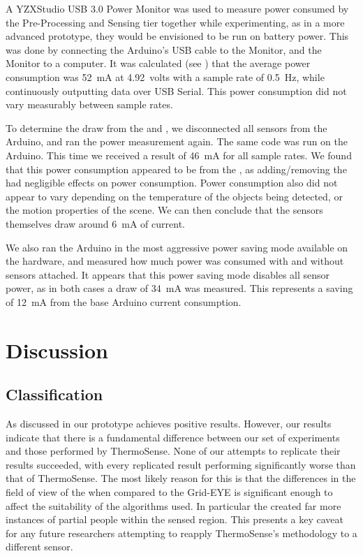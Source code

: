 \documentclass[../thesis/thesis.tex]{subfiles}
\begin{document}
A YZXStudio USB 3.0 Power Monitor was used to measure power consumed by the Pre-Processing and Sensing tier together while experimenting, as in a more advanced prototype, they would be envisioned to be run on battery power. This was done by connecting the Arduino's USB cable to the Monitor, and the Monitor to a computer. It was calculated (see ) that the average power consumption was 52~mA at 4.92~volts with a sample rate of 0.5~Hz, while continuously outputting data over USB Serial. This power consumption did not vary measurably between sample rates.

To determine the draw from the \pir and \iar, we disconnected all sensors from the Arduino, and ran the power measurement again. The same code was run on the Arduino. This time we received a result of 46~mA  for all sample rates. We found that this power consumption appeared to be from the \mlx, as adding/removing the \pir had negligible effects on power consumption. Power consumption also did not appear to vary depending on the temperature of the objects being detected, or the motion properties of the scene. We can then conclude that the sensors themselves draw around 6~mA of current.

We also ran the Arduino in the most aggressive power saving mode available on the hardware, and measured how much power was consumed with and without sensors attached. It appears that this power saving mode disables all sensor power, as in both cases a draw of 34~mA was measured. This represents a saving of 12~mA from the base Arduino current consumption.

\section{Discussion}

\subsection{Classification}
As discussed in  our prototype achieves positive results. However, our results indicate that there is a fundamental difference between our set of experiments and those performed by ThermoSense. None of our attempts to replicate their results succeeded, with every replicated result performing significantly worse than that of ThermoSense. The most likely reason for this is that the differences in the field of view of the \mlx when compared to the Grid-EYE is significant enough to affect the suitability of the algorithms used. In particular the \mlx created far more instances of partial people within the sensed region. This presents a key caveat for any future researchers attempting to reapply ThermoSense's methodology to a different sensor.
\end{document}
